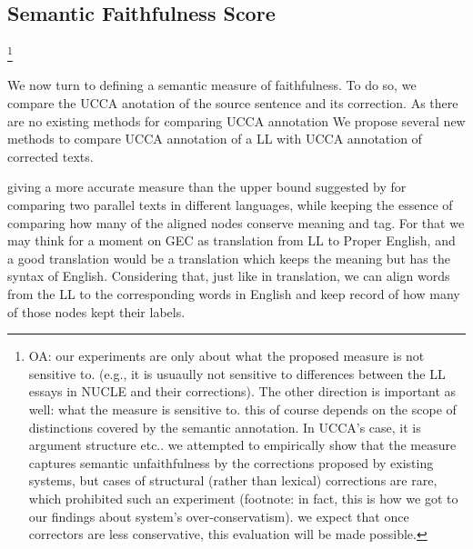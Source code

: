 \documentclass[letter,11pt]{article}
\newcommand{\oa}[1]{\footnote{\color{red}OA: #1}}
\begin{document}


\subsection{Semantic Faithfulness Score}


\oa{our experiments are only about what the proposed measure is not sensitive to. (e.g., it is
  usuaully not sensitive to differences between the LL essays in NUCLE and their corrections).
  The other direction is important as well: what the measure is sensitive to. this of course
  depends on the scope of distinctions covered by the semantic annotation. In UCCA's case,
  it is argument structure etc.. we attempted to empirically show that the measure
  captures semantic unfaithfulness by the corrections proposed by existing systems,
  but cases of structural (rather than lexical) corrections are rare, which prohibited
  such an experiment (footnote: in fact, this is how we got to our findings about system's
  over-conservatism). we expect that once correctors are less conservative, this evaluation
  will be made possible. }


We now turn to defining a semantic measure of faithfulness.
To do so, we compare the UCCA anotation of the source sentence and its correction.
As there are no existing methods for comparing UCCA annotation 
We propose several new methods to compare UCCA annotation of a LL with UCCA
annotation of corrected texts.

giving a more accurate
measure than the upper bound suggested by \cite{sulem2015conceptual} for
comparing two parallel texts in different languages, while keeping
the essence of comparing how many of the aligned nodes conserve meaning and tag. For that we may think for a moment on GEC as
translation from LL to Proper English, and a good translation
would be a translation which keeps the meaning but has the syntax
of English. Considering that, just like in translation, we can align words from the LL to the corresponding words in English
and keep record of how many of those nodes kept their labels.
\end{document}
